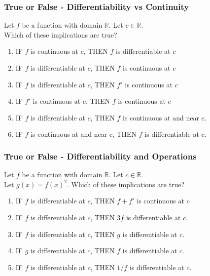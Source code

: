 \documentclass[14pt]{beamer}
\newcommand {\DS} [1] {${\displaystyle #1}$}
\newcommand {\R}{\mathbb{R}}
\newcommand{\azul}[1]{{\color{blue} #1}}
\newcommand{\rojo}[1]{{\color{red} #1}}
\newcommand{\setsize}[1]{\fontsize{#1}{#1}\selectfont} %
\newcommand{\smallerfont}{\setsize{13}} %
\begin{document}
\begin{frame}[t]
\smallerfont
\frametitle{True or False - Differentiability vs Continuity}

Let $f$ be a function with domain $\R$.  Let $c \in \R$. \\
Which of these implications are true?

\vfill

\begin{enumerate}
	\item IF $f$ is \rojo{continuous} at $c$, THEN $f$ is \azul{differentiable} at $c$
\vfill
	\item IF $f$ is \azul{differentiable} at $c$, THEN $f$ is \rojo{continuous} at $c$
\vfill
	\item IF $f$ is \azul{differentiable} at $c$, THEN $f'$ is \rojo{continuous} at $c$
\vfill
	\item IF $f'$ is \rojo{continuous} at $c$, THEN $f$ is \rojo{continuous} at $c$
\vfill
	\item IF $f$ is \azul{differentiable} at $c$, THEN $f$ is \rojo{continuous} at and near $c$.
\vfill
	\item IF $f$ is \rojo{continuous} at and near $c$, THEN $f$ is \azul{differentiable} at $c$.
\vfill
\end{enumerate}
 
\end{frame}
\begin{frame}[t]
\smallerfont
\frametitle{True or False - Differentiability and Operations}

Let $f$ be a function with domain $\R$.  Let $c \in \R$. \\
Let \DS{g(x) = f(x)^2}.
Which of these implications are true?

\vfill

\begin{enumerate}
	\item IF $f$ is \azul{differentiable} at $c$, THEN $f+f'$ is \rojo{continuous} at $c$
\vfill
	\item IF $f$ is \azul{differentiable} at $c$, THEN $3f$ is \azul{differentiable} at $c$.
\vfill
	\item IF $f$ is \azul{differentiable} at $c$, THEN $g$ is \azul{differentiable} at $c$.
\vfill
	\item IF $g$ is \azul{differentiable} at $c$, THEN $f$ is \azul{differentiable} at $c$.
\vfill
	\item IF $f$ is \azul{differentiable} at $c$, THEN $1/f$ is \azul{differentiable} at $c$.
\vfill
\end{enumerate}
 
\end{frame}
\end{document}
